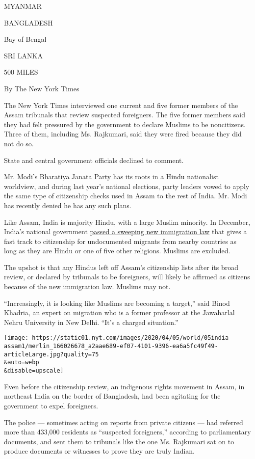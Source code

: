 MYANMAR

BANGLADESH

Bay of Bengal

SRI LANKA

500 MILES

By The New York Times

The New York Times interviewed one current and five former members of
the Assam tribunals that review suspected foreigners. The five former
members said they had felt pressured by the government to declare
Muslims to be noncitizens. Three of them, including Ms. Rajkumari, said
they were fired because they did not do so.

State and central government officials declined to comment.

Mr. Modi's Bharatiya Janata Party has its roots in a Hindu nationalist
worldview, and during last year's national elections, party leaders
vowed to apply the same type of citizenship checks used in Assam to the
rest of India. Mr. Modi has recently denied he has any such plans.

Like Assam, India is majority Hindu, with a large Muslim minority. In
December, India's national government
\href{https://www.nytimes.com/2019/12/11/world/asia/india-muslims-citizenship-narendra-modi.html}{passed
a sweeping new immigration law} that gives a fast track to citizenship
for undocumented migrants from nearby countries as long as they are
Hindu or one of five other religions. Muslims are excluded.

The upshot is that any Hindus left off Assam's citizenship lists after
its broad review, or declared by tribunals to be foreigners, will likely
be affirmed as citizens because of the new immigration law. Muslims may
not.

``Increasingly, it is looking like Muslims are becoming a target,'' said
Binod Khadria, an expert on migration who is a former professor at the
Jawaharlal Nehru University in New Delhi. ``It's a charged situation.''

\texttt{[image: https://static01.nyt.com/images/2020/04/05/world/05india-assam1/merlin\_166026678\_a2aae689-ef07-4101-9396-ea6a5fc49f49-articleLarge.jpg?quality=75\\\&auto=webp\\\&disable=upscale]}

Even before the citizenship review, an indigenous rights movement in
Assam, in northeast India on the border of Bangladesh, had been
agitating for the government to expel foreigners.

The police --- sometimes acting on reports from private citizens --- had
referred more than 433,000 residents as ``suspected foreigners,''
according to parliamentary documents, and sent them to tribunals like
the one Ms. Rajkumari sat on to produce documents or witnesses to prove
they are truly Indian.

